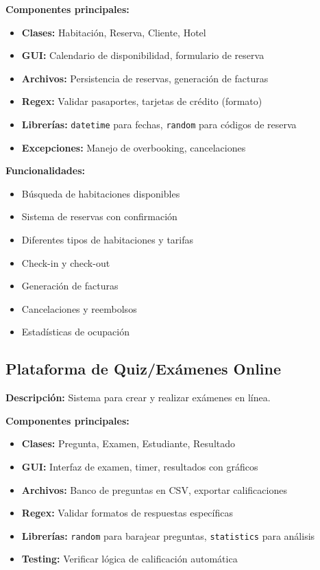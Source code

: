 \documentclass[12pt,a4paper]{article}
\begin{document}
\vspace{0.5em}
\textbf{Componentes principales:}
\begin{itemize}
    \item \textbf{Clases:} Habitación, Reserva, Cliente, Hotel
    \item \textbf{GUI:} Calendario de disponibilidad, formulario de reserva
    \item \textbf{Archivos:} Persistencia de reservas, generación de facturas
    \item \textbf{Regex:} Validar pasaportes, tarjetas de crédito (formato)
    \item \textbf{Librerías:} \texttt{datetime} para fechas, \texttt{random} para códigos de reserva
    \item \textbf{Excepciones:} Manejo de overbooking, cancelaciones
\end{itemize}

\vspace{0.5em}
\textbf{Funcionalidades:}
\begin{itemize}
    \item Búsqueda de habitaciones disponibles
    \item Sistema de reservas con confirmación
    \item Diferentes tipos de habitaciones y tarifas
    \item Check-in y check-out
    \item Generación de facturas
    \item Cancelaciones y reembolsos
    \item Estadísticas de ocupación
\end{itemize}

\subsection{Plataforma de Quiz/Exámenes Online}

\textbf{Descripción:} Sistema para crear y realizar exámenes en línea.

\vspace{0.5em}
\textbf{Componentes principales:}
\begin{itemize}
    \item \textbf{Clases:} Pregunta, Examen, Estudiante, Resultado
    \item \textbf{GUI:} Interfaz de examen, timer, resultados con gráficos
    \item \textbf{Archivos:} Banco de preguntas en CSV, exportar calificaciones
    \item \textbf{Regex:} Validar formatos de respuestas específicas
    \item \textbf{Librerías:} \texttt{random} para barajear preguntas, \texttt{statistics} para análisis
    \item \textbf{Testing:} Verificar lógica de calificación automática
\end{itemize}
\end{document}
